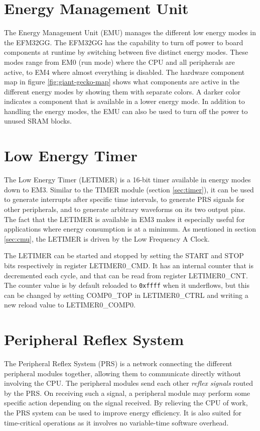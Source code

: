 \section{Energy Management Unit}\label{sec:emu}
The Energy Management Unit (EMU) manages the different low energy modes in the EFM32GG. The EFM32GG has the capability to turn off power to board components at runtime by switching between five distinct energy modes. These modes range from EM0 (run mode) where the CPU and all peripherals are active, to EM4 where almost everything is disabled. The hardware component map in figure \ref{fig:giant-gecko-map} shows what components are active in the different energy modes by showing them with separate colors. A darker color indicates a component that is available in a lower energy mode. In addition to handling the energy modes, the EMU can also be used to turn off the power to unused SRAM blocks.\cite{efm32gg-rm}


\section{Low Energy Timer}\label{sec:letimer}
The Low Energy Timer (LETIMER) is a 16-bit timer available in energy modes down to EM3. Similar to the TIMER module (section \ref{sec:timer}), it can be used to generate interrupts after specific time intervals, to generate PRS signals for other peripherals, and to generate arbitrary waveforms on its two output pins. The fact that the LETIMER is available in EM3 makes it especially useful for applications where energy consumption is at a minimum. As mentioned in section \ref{sec:cmu}, the LETIMER is driven by the Low Frequency A Clock.

The LETIMER can be started and stopped by setting the START and STOP bits respectively in register LETIMER0\_CMD. It has an internal counter that is decremented each cycle, and that can be read from register LETIMER0\_CNT. The counter value is by default reloaded to \texttt{0xffff} when it underflows, but this can be changed by setting COMP0\_TOP in LETIMER0\_CTRL and writing a new reload value to LETIMER0\_COMP0. 


\section{Peripheral Reflex System}\label{sec:prs}
The Peripheral Reflex System (PRS) is a network connecting the different peripheral modules together, allowing them to communicate directly without involving the CPU. The peripheral modules send each other \emph{reflex signals} routed by the PRS. On receiving such a signal, a peripheral module may perform some specific action depending on the signal received. By relieving the CPU of work, the PRS system can be used to improve energy efficiency. It is also suited for time-critical operations as it involves no variable-time software overhead.


